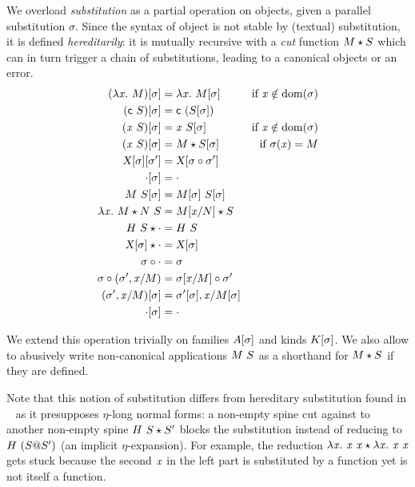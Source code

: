 \documentclass[9pt]{sigplanconf}
\begin{document}
We overload \emph{substitution} as a partial operation on objects, given
a parallel substitution $\sigma$. Since the syntax of object is not
stable by (textual) substitution, it is defined \emph{hereditarily}: it
is mutually recursive with a \emph{cut} function ${M}\star{S}$ which can
in turn trigger a chain of substitutions, leading to a canonical objects
or an error.
\begin{align*}
  {(\lambda{\ensuremath{\text{\textit{x}}}}.\ M)}[{\sigma}] &= \lambda{\ensuremath{\text{\textit{x}}}}.\  {{M}[{\sigma}]} &
  \text{if $\text{\textit{x}}\notin \operatorname{dom}{\!(\sigma)}$}
  \\
  {({\text{\textsf{c}}}\  S)}[{\sigma}] &= {\text{\textsf{c}}}\  {({S}[{\sigma}])}
  \\
  {({\text{\textit{x}}}\  S)}[{\sigma}] &=
  {\text{\textit{x}}}\  {{S}[{\sigma}]} &
  \text{if $\text{\textit{x}}\notin \operatorname{dom}{\!(\sigma)}$}
  \\
  {({\text{\textit{x}}}\  S)}[{\sigma}] &=
  {M}\star{{S}[{\sigma}]} &
  \text{if $\sigma(\text{\textit{x}}) = M$}
  \\
  {{\text{\textsl{X}}}[{\sigma}]}[{\sigma'}] &=
  {\text{\textsl{X}}}[{{\sigma}\circ{\sigma'}}]
  \\
  {\cdot}[{\sigma}] &=
  \cdot \\
  {{M}\ {S}}[{\sigma}] &=
  {{M}[{\sigma}]}\ {{S}[{\sigma}]}
  \\
  {\lambda{\ensuremath{\text{\textit{x}}}}.\  M}\star{{N}\ {S}} &=
  {{M}[{{\text{\textit{x}}}/{N}}]}\star{S}
  \\
  {{H}\  S}\star{\cdot} &=
  {H}\  S
  \\
  {{\text{\textsl{X}}}[{\sigma}]}\star{\cdot} &= {\text{\textsl{X}}}[{\sigma}]
  \\
  {\sigma}\circ{\cdot} &=
  \sigma
  \\
  {\sigma}\circ{({\sigma'},{{\ensuremath{\text{\textit{x}}}}/{M}})} &=
  {{\sigma}[{{\text{\textit{x}}}/{M}}]}\circ{\sigma}'
  \\
  {({\sigma'},{{\text{\textit{x}}}/{M}})}[{\sigma}] &=
  {{\sigma'}[{\sigma}]},{{\text{\textit{x}}}/{{M}[{\sigma}]}}
  \\
  {\cdot}[{\sigma}] &= \cdot
\end{align*}

We extend this operation trivially on families ${A}[{\sigma}]$ and
kinds ${K}[{\sigma}]$. We also allow to abusively write
non-canonical applications ${M}\  S$ as a shorthand for ${M}\star{S}$
if they are defined.

Note that this notion of substitution differs from hereditary
substitution found in \eg\ \cite{hl07mechanizing} as it presupposes
$\eta$-long normal forms: a non-empty spine cut against to another
non-empty spine ${{H}\  S}\star{S'}$ blocks the substitution
instead of reducing to ${H}\  {({S}@{S}')}$ (an implicit
$\eta$-expansion). For example, the reduction ${\lambda{\ensuremath{\text{\textit{x}}}}.\  {\text{\textit{x}}}\ {\text{\textit{x}}}}\star{\lambda{\ensuremath{\text{\textit{x}}}}.\ {\ensuremath{\text{\textit{x}}}}\ {\ensuremath{\text{\textit{x}}}}}$ gets stuck because
the second $\text{\textit{x}}$ in the left part is substituted by a function yet
is not itself a function.
\end{document}
